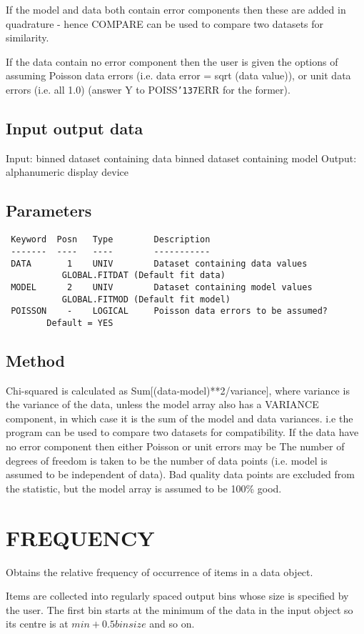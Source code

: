 \documentclass{book}
\renewcommand{\_}{{\tt\char'137}}     %
\begin{document}
If the model and data both contain error components then these
are added in quadrature - hence COMPARE can be used to compare
two datasets for similarity.

If the data contain no error component then the user is given the
options of assuming Poisson data errors (i.e. data error = sqrt
(data value)), or unit data errors (i.e. all 1.0) (answer Y to
POISS\_ERR for the former).

\subsection{Input output data}
Input: binned dataset containing data
binned dataset containing model
Output: alphanumeric display device
\subsection{Parameters}
\begin{verbatim}
 Keyword  Posn   Type        Description
 -------  ----   ----        -----------
 DATA       1    UNIV        Dataset containing data values
           GLOBAL.FITDAT (Default fit data)
 MODEL      2    UNIV        Dataset containing model values
           GLOBAL.FITMOD (Default fit model)
 POISSON    -    LOGICAL     Poisson data errors to be assumed?
        Default = YES

\end{verbatim}\subsection{Method}
Chi-squared is calculated as Sum[(data-model)**2/variance], where
variance is the variance of the data, unless the model array also
has a VARIANCE component, in which case it is the sum of the
model and data variances. i.e the program can be used to compare
two datasets for compatibility. If the data have no error
component then either Poisson or unit errors may be The number of
degrees of freedom is taken to be the number of data points (i.e.
model is assumed to be independent of data). Bad quality data
points are excluded from the statistic, but the model array is
assumed to be 100\% good.

\section{FREQUENCY}
Obtains the relative frequency of occurrence of items in a data
object.

Items are collected into regularly spaced output bins whose size
is specified by the user. The first bin starts at the minimum of
the data in the input object so its centre is at
$min + 0.5 binsize$ and so on.
\end{document}
